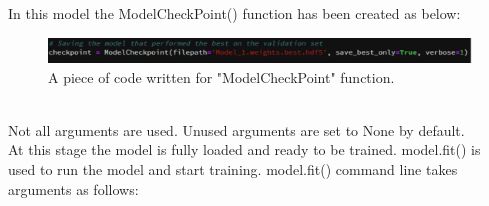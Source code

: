 \begin{itemize}
\begin{itemize}
\end{itemize}
In this model the ModelCheckPoint() function has been created as below:
\begin{figure}[ht]
    \centering
    \includegraphics{Figures/ef1}
    \decoRule
    \caption [A piece of code written for "ModelCheckPoint" function.]{A piece of code written for "ModelCheckPoint" function.}
    \label{fig:la}
    \end{figure}\hfill \\
    Not all arguments are used. Unused arguments are set to None by default.\\

At this stage the model is fully loaded and ready to be trained. model.fit() is used to run the model and start training. 
model.fit() command line takes arguments as follows:\\
\noindent{}
\end{itemize}
